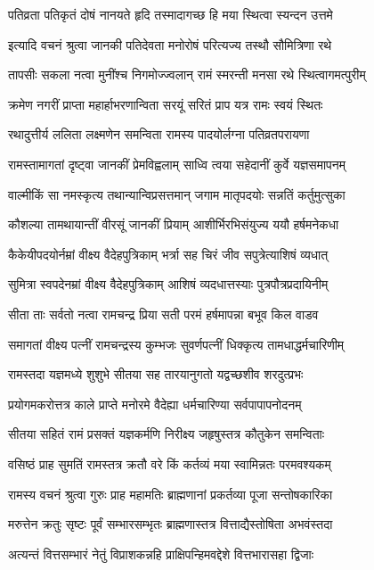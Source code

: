 \twolineshloka
{पतिव्रता पतिकृतं दोषं नानयते हृदि}
{तस्मादागच्छ हि मया स्थित्वा स्यन्दन उत्तमे}%

\twolineshloka
{इत्यादि वचनं श्रुत्वा जानकी पतिदेवता}
{मनोरोषं परित्यज्य तस्थौ सौमित्रिणा रथे}%

\twolineshloka
{तापसीः सकला नत्वा मुनींश्च निगमोज्ज्वलान्}
{रामं स्मरन्ती मनसा रथे स्थित्वागमत्पुरीम्}%

\twolineshloka
{क्रमेण नगरीं प्राप्ता महार्हाभरणान्विता}
{सरयूं सरितं प्राप यत्र रामः स्वयं स्थितः}%

\twolineshloka
{रथादुत्तीर्य ललिता लक्ष्मणेन समन्विता}
{रामस्य पादयोर्लग्ना पतिव्रतपरायणा}%

\twolineshloka
{रामस्तामागतां दृष्ट्वा जानकीं प्रेमविह्वलाम्}
{साध्वि त्वया सहेदानीं कुर्वे यज्ञसमापनम्}%

\twolineshloka
{वाल्मीकिं सा नमस्कृत्य तथान्यान्विप्रसत्तमान्}
{जगाम मातृपदयोः सन्नतिं कर्तुमुत्सुका}%

\twolineshloka
{कौशल्या तामथायान्तीं वीरसूं जानकीं प्रियाम्}
{आशीर्भिरभिसंयुज्य ययौ हर्षमनेकधा}%

\twolineshloka
{कैकेयीपदयोर्नम्रां वीक्ष्य वैदेहपुत्रिकाम्}
{भर्त्रा सह चिरं जीव सपुत्रेत्याशिषं व्यधात्}%

\twolineshloka
{सुमित्रा स्वपदेनम्रां वीक्ष्य वैदेहपुत्रिकाम्}
{आशिषं व्यदधात्तस्याः पुत्रपौत्रप्रदायिनीम्}%

\twolineshloka
{सीता ताः सर्वतो नत्वा रामचन्द्र प्रिया सती}
{परमं हर्षमापन्ना बभूव किल वाडव}%

\twolineshloka
{समागतां वीक्ष्य पत्नीं रामचन्द्रस्य कुम्भजः}
{सुवर्णपत्नीं धिक्कृत्य तामधाद्धर्मचारिणीम्}%

\twolineshloka
{रामस्तदा यज्ञमध्ये शुशुभे सीतया सह}
{तारयानुगतो यद्वच्छशीव शरदुत्प्रभः}%

\twolineshloka
{प्रयोगमकरोत्तत्र काले प्राप्ते मनोरमे}
{वैदेह्या धर्मचारिण्या सर्वपापापनोदनम्}%

\twolineshloka
{सीतया सहितं रामं प्रसक्तं यज्ञकर्मणि}
{निरीक्ष्य जहृषुस्तत्र कौतुकेन समन्विताः}%

\twolineshloka
{वसिष्ठं प्राह सुमतिं रामस्तत्र क्रतौ वरे}
{किं कर्तव्यं मया स्वामिन्नतः परमवश्यकम्}%

\twolineshloka
{रामस्य वचनं श्रुत्वा गुरुः प्राह महामतिः}
{ब्राह्मणानां प्रकर्तव्या पूजा सन्तोषकारिका}%

\twolineshloka
{मरुत्तेन क्रतुः सृष्टः पूर्वं सम्भारसम्भृतः}
{ब्राह्मणास्तत्र वित्ताद्यैस्तोषिता अभवंस्तदा}%

\twolineshloka
{अत्यन्तं वित्तसम्भारं नेतुं विप्राशकन्नहि}
{प्राक्षिपन्हिमवद्देशे वित्तभारासहा द्विजाः}%

